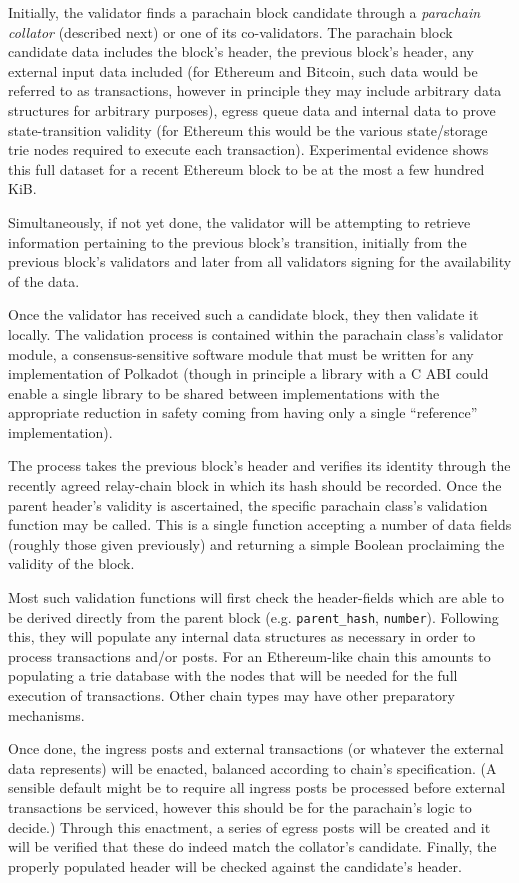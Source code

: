 \documentclass[9pt,oneside]{amsart}
\begin{document}
\begin{multicols}{2}
 Initially, the validator finds a parachain block candidate through a \emph{parachain collator} (described next) or one of its co-validators. The parachain block candidate data includes the block's header, the previous block's header, any external input data included (for Ethereum and Bitcoin, such data would be referred to as transactions, however in principle they may include arbitrary data structures for arbitrary purposes), egress queue data and internal data to prove state-transition validity (for Ethereum this would be the various state/storage trie nodes required to execute each transaction). Experimental evidence shows this full dataset for a recent Ethereum block to be at the most a few hundred KiB.

 Simultaneously, if not yet done, the validator will be attempting to retrieve information pertaining to the previous block's transition, initially from the previous block's validators and later from all validators signing for the availability of the data.

 Once the validator has received such a candidate block, they then validate it locally. The validation process is contained within the parachain class's validator module, a consensus-sensitive software module that must be written for any implementation of Polkadot (though in principle a library with a C ABI could enable a single library to be shared between implementations with the appropriate reduction in safety coming from having only a single ``reference'' implementation).

 The process takes the previous block's header and verifies its identity through the recently agreed relay-chain block in which its hash should be recorded. Once the parent header's validity is ascertained, the specific parachain class's validation function may be called. This is a single function accepting a number of data fields (roughly those given previously) and returning a simple Boolean proclaiming the validity of the block.

 Most such validation functions will first check the header-fields which are able to be derived directly from the parent block (e.g. \texttt{parent\_hash}, \texttt{number}). Following this, they will populate any internal data structures as necessary in order to process transactions and/or posts. For an Ethereum-like chain this amounts to populating a trie database with the nodes that will be needed for the full execution of transactions. Other chain types may have other preparatory mechanisms.

 Once done, the ingress posts and external transactions (or whatever the external data represents) will be enacted, balanced according to chain's specification. (A sensible default might be to require all ingress posts be processed before external transactions be serviced, however this should be for the parachain's logic to decide.) Through this enactment, a series of egress posts will be created and it will be verified that these do indeed match the collator's candidate. Finally, the properly populated header will be checked against the candidate's header.


\end{multicols}
\end{document}
